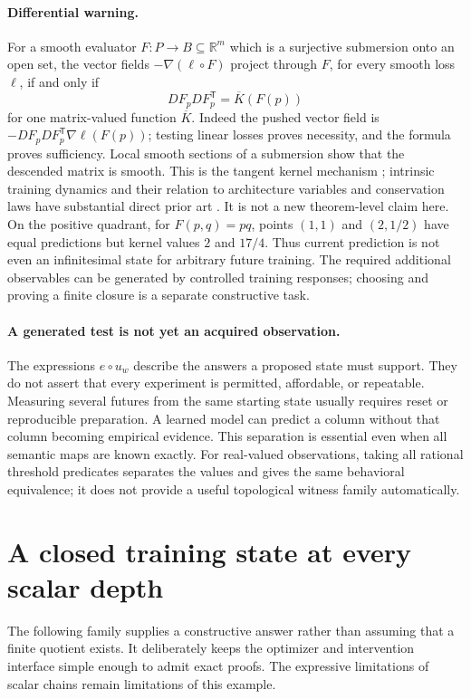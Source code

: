 \documentclass[11pt]{article}
\theoremstyle{definition}\newtheorem{definition}[theorem]{Definition}
\theoremstyle{remark}\newtheorem{remark}[theorem]{Remark}
\newcommand{\R}{\mathbb R}
\begin{document}
\paragraph{Differential warning.}
For a smooth evaluator $F:P\to B\subseteq\R^m$ which is a surjective
submersion onto an open set, the vector fields
$-\nabla(\ell\circ F)$ project through $F$, for every smooth loss $\ell$,
if and only if
\[
 DF_pDF_p^{\mathsf T}=\overline K(F(p))                         
\]
for one matrix-valued function $\overline K$. Indeed the pushed vector field
is $-DF_pDF_p^{\mathsf T}\nabla\ell(F(p))$; testing linear losses proves
necessity, and the formula proves sufficiency. Local smooth sections of a
submersion show that the descended matrix is smooth. This is the tangent
kernel mechanism \cite{jacot}; intrinsic training dynamics and their relation
to architecture variables and conservation laws have substantial direct
prior art \cite{marcotte}. It is not a new theorem-level claim here.
On the positive quadrant, for $F(p,q)=pq$, points $(1,1)$ and $(2,1/2)$ have equal predictions but
kernel values $2$ and $17/4$. Thus current prediction is not even an
infinitesimal state for arbitrary future training. The required additional
observables can be generated by controlled training responses; choosing
and proving a finite closure is a separate constructive task.


\paragraph{A generated test is not yet an acquired observation.}
The expressions $e\circ u_w$ describe the answers a proposed state must
support. They do not assert that every experiment is permitted, affordable,
or repeatable. Measuring several futures from the same starting state
usually requires reset or reproducible preparation. A learned model can
predict a column without that column becoming empirical evidence. This
separation is essential even when all semantic maps are known exactly.
For real-valued observations, taking all rational threshold predicates
separates the values and gives the same behavioral equivalence; it does
not provide a useful topological witness family automatically.

\section{A closed training state at every scalar depth}
The following family supplies a constructive answer rather than assuming
that a finite quotient exists. It deliberately keeps the optimizer and
intervention interface simple enough to admit exact proofs. The expressive
limitations of scalar chains remain limitations of this example.
\end{document}
